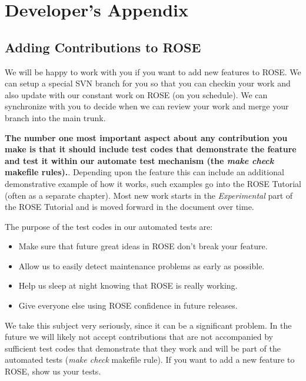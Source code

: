 
\chapter{ Developer's Appendix }
\label{developersAppendix:developersAppendix}

\section{Adding Contributions to ROSE}%

   We will be happy to work with you if you want to add new features to ROSE.
We can setup a special SVN branch for you so that you can checkin your work and
also update with our constant work on ROSE (on you schedule).  We can synchronize with 
you to decide when we can review your work and merge your branch into the main trunk.

{\bf The number one most important aspect about any contribution you make is that it
should include test codes that demonstrate the feature and test it within our 
automate test mechanism (the {\em make check} makefile rules).}. Depending upon the 
feature this can include an additional demonstrative example of how it works, such
examples go into the ROSE Tutorial (often as a separate chapter).  Most new work
starts in the {\em Experimental} part of the ROSE Tutorial and is moved forward
in the document over time.

The purpose of the test codes in our automated tests are:
\begin{itemize}
   \item Make sure that future great ideas in ROSE don't break your feature.
   \item Allow us to easily detect maintenance problems as early as possible.
   \item Help us sleep at night knowing that ROSE is really working.
   \item Give everyone else using ROSE confidence in future releases.
\end{itemize}

We take this subject very seriously, since it can be a significant problem.
In the future we will likely not accept contributions that are not accompanied 
by sufficient test codes that demonstrate that they work and will be part of the
automated tests ({\em make check} makefile rule).  If you want to add a new 
feature to ROSE, show us your tests.

